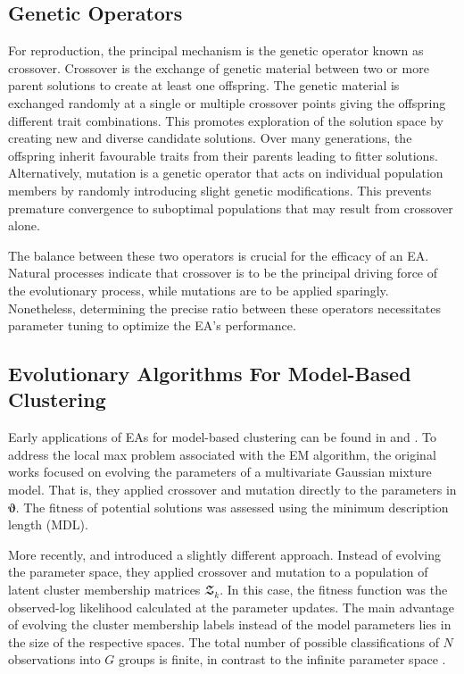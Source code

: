 \documentclass[12pt]{report}
\begin{document}
\subsection{Genetic Operators}
For reproduction, the principal mechanism is the genetic operator known as crossover. Crossover is the exchange of genetic material between two or more parent solutions to create at least one offspring. The genetic material is exchanged randomly at a single or multiple crossover points giving the offspring different trait combinations. This promotes exploration of the solution space by creating new and diverse candidate solutions. Over many generations, the offspring inherit favourable traits from their parents leading to fitter solutions. Alternatively, mutation is a genetic operator that acts on individual population members by randomly introducing slight genetic modifications. This prevents premature convergence to suboptimal populations that may result from crossover alone. 

The balance between these two operators is crucial for the efficacy of an EA. Natural processes indicate that crossover is to be the principal driving force of the evolutionary process, while mutations are to be applied sparingly. Nonetheless, determining the precise ratio between these operators necessitates parameter tuning to optimize the EA's performance.




\subsection{Evolutionary Algorithms For Model-Based Clustering}
Early applications of EAs for model-based clustering can be found in \citet{martinez2000} and \citet{pernkopf2005}. To address the local max problem associated with the EM algorithm, the original works focused on evolving the parameters of a multivariate Gaussian mixture model. That is, they applied crossover and mutation directly to the parameters in $\bm{\vartheta}$. The fitness of potential solutions was assessed using the minimum description length (MDL). 

More recently, \citet{andrews2013} and \citet{mcnicholas2020} introduced a slightly different approach. Instead of evolving the parameter space, they applied crossover and mutation to a population of latent cluster membership matrices $\mathbfcal{Z}_k$. In this case, the fitness function was the observed-log likelihood calculated at the parameter updates. The main advantage of evolving the cluster membership labels instead of the model parameters lies in the size of the respective spaces. The total number of possible classifications of $N$ observations into $G$ groups is finite, in contrast to the infinite parameter space \citep{andrews2013}.
\end{document}
